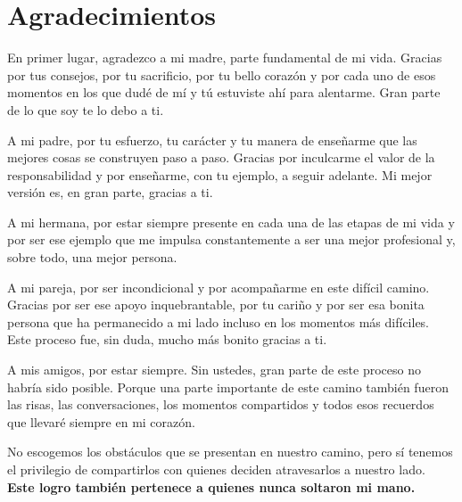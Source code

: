 \chapter*{Agradecimientos}
En primer lugar, agradezco a mi madre, parte fundamental de mi vida. Gracias por tus consejos, por tu sacrificio, por tu bello corazón y por cada uno de esos momentos en los que dudé de mí y tú estuviste ahí para alentarme. Gran parte de lo que soy te lo debo a ti.

A mi padre, por tu esfuerzo, tu carácter y tu manera de enseñarme que las mejores cosas se construyen paso a paso. Gracias por inculcarme el valor de la responsabilidad y por enseñarme, con tu ejemplo, a seguir adelante. Mi mejor versión es, en gran parte, gracias a ti.

A mi hermana, por estar siempre presente en cada una de las etapas de mi vida y por ser ese ejemplo que me impulsa constantemente a ser una mejor profesional y, sobre todo, una mejor persona.

A mi pareja, por ser incondicional y por acompañarme en este difícil camino. Gracias por ser ese apoyo inquebrantable, por tu cariño y por ser esa bonita persona que ha permanecido a mi lado incluso en los momentos más difíciles. Este proceso fue, sin duda, mucho más bonito gracias a ti.

A mis amigos, por estar siempre. Sin ustedes, gran parte de este proceso no habría sido posible. Porque una parte importante de este camino también fueron las risas, las conversaciones, los momentos compartidos y todos esos recuerdos que llevaré siempre en mi corazón.

No escogemos los obstáculos que se presentan en nuestro camino, pero sí tenemos el privilegio de compartirlos con quienes deciden atravesarlos a nuestro lado. \textbf{Este logro también pertenece a quienes nunca soltaron mi mano.}
